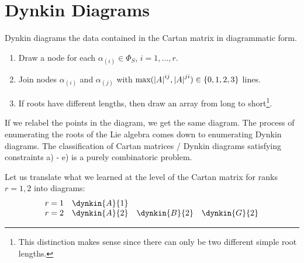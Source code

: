 \section{Dynkin Diagrams}%
\label{sec:dynkin_diagrams}

Dynkin diagrams the data contained in the Cartan matrix in diagrammatic form.
\begin{enumerate}[]
  \item Draw a node for each $\alpha_{(i)} \in \Phi_S$, $i = 1, \dots, r$.
\item Join nodes $\alpha_{(i)}$ and $\alpha_{(j)}$ with $\text{max}(\abs{A}^{ij}, \abs{A}^{ji}) \in \{0, 1, 2, 3\}$ lines.
  \item If roots have different lengths, then draw an array from long to short\footnote{This distinction makes sense since there can only be two different simple root lengths.}.
\end{enumerate}
If we relabel the points in the diagram, we get the same diagram. The process of enumerating the roots of the Lie algebra comes down to enumerating Dynkin diagrams.
The classification of Cartan matrices / Dynkin diagrams satisfying constraints a) - e) is a purely combinatoric problem.

\newcommand*{\Dynk}[2]{#1_{#2} & \dynkin{#1}{#2}}

Let us translate what we learned at the level of the Cartan matrix for ranks $r = 1,2$ into diagrams:
\[ \begin{array}{ll}
  r = 1 & \dynkin{A}{1} \\
  r = 2 & \dynkin{A}{2}
	 \quad \dynkin{B}{2}
	 \quad \dynkin{G}{2}
\end{array} \]

